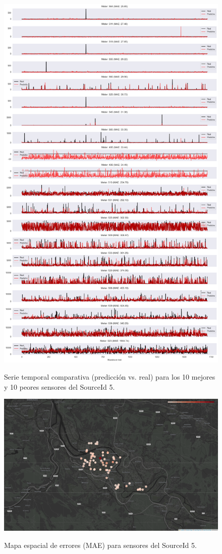 \begin{figure}[H]
	\centering
	\caption{Serie temporal comparativa (predicción vs. real) para los 10 mejores y 10 peores sensores del SourceId 5.}
	\includegraphics[width=0.75\linewidth]{includes/cap5/graphs/advanced/sid5_10best_10worst_meter_time_series.png}
	\label{fig:sid5_timeseries_best_worst}
\end{figure}

\begin{figure}[H]
	\centering
	\caption{Mapa espacial de errores (MAE) para sensores del SourceId 5.}
	\includegraphics[width=0.9\linewidth]{includes/cap5/graphs/advanced/sid5_meters_error_rate_map.png}
	\label{fig:sid5_error_map}
\end{figure}


